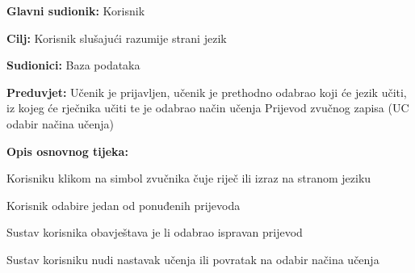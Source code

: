 					\noindent {}
					\begin{packed_item}

						\item \textbf{Glavni sudionik: } Korisnik
						\item \textbf{Cilj: } Korisnik slušajući razumije strani jezik
						\item \textbf{Sudionici: } Baza podataka
						\item \textbf{Preduvjet: } Učenik je prijavljen, učenik je prethodno odabrao koji će jezik učiti, iz kojeg će rječnika učiti te je odabrao način učenja Prijevod zvučnog zapisa (UC odabir načina učenja)
						\item  \textbf{Opis osnovnog tijeka:} 
						
						\item[] \begin{packed_enum}

							\item Korisniku klikom na simbol zvučnika čuje riječ ili izraz na stranom jeziku
							\item Korisnik odabire jedan od ponuđenih prijevoda 
							\item Sustav korisnika obavještava je li odabrao ispravan prijevod
							\item Sustav korisniku nudi nastavak učenja ili povratak na odabir načina učenja

						\end{packed_enum}

					\end{packed_item}



